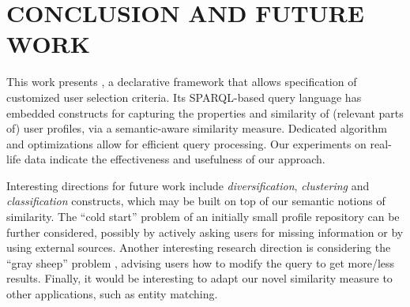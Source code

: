 \section{CONCLUSION AND FUTURE WORK}
\label{sec:conc}

This work presents \qlang{}, a declarative framework that allows specification of customized user
selection criteria. Its SPARQL-based query language has embedded constructs for capturing the
properties and similarity of (relevant parts of) user profiles, via
a semantic-aware similarity measure. Dedicated algorithm and optimizations 
allow for efficient query processing. Our experiments on
real-life data indicate the effectiveness and usefulness of our approach.






Interesting directions for future work include  \emph{diversification}, \emph{clustering} and \emph{classification}
constructs, which may be built on top of our semantic notions of
similarity. The ``cold start'' problem of an initially small profile repository can be further considered, possibly by actively asking users for 
missing information or by using external sources. Another interesting research direction is considering the ``gray sheep'' problem \cite{ghazanfar2014leveraging}, advising users how to modify the query to get more/less results. Finally, it would be interesting to adapt our novel similarity measure to other applications, such as entity matching.



